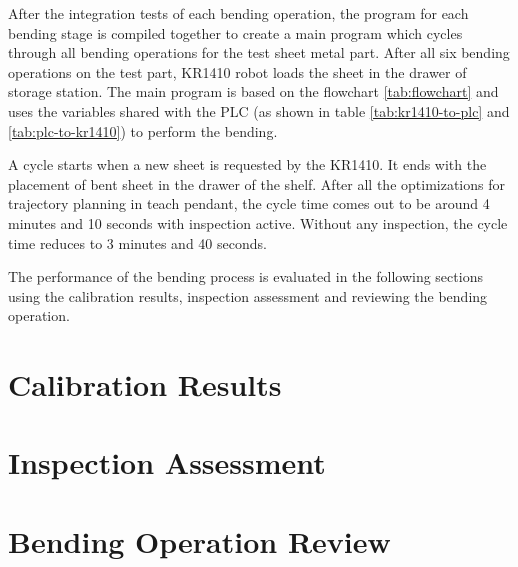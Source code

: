 After the integration tests of each bending operation, the program for each bending stage is compiled together to create a main program which cycles through all bending operations for the test sheet metal part. After all six bending operations on the test part, KR1410 robot loads the sheet in the drawer of storage station.
The main program is based on the flowchart \ref{tab:flowchart} and uses the variables shared with the PLC (as shown in table \ref{tab:kr1410-to-plc} and \ref{tab:plc-to-kr1410}) to perform the bending.

A cycle starts when a new sheet is requested by the KR1410. It ends with the placement of bent sheet in the drawer of the shelf. After all the optimizations for trajectory planning in teach pendant, the cycle time comes out to be around 4 minutes and 10 seconds with inspection active. Without any inspection, the cycle time reduces to 3 minutes and 40 seconds.

The performance of the bending process is evaluated in the following sections using the calibration results, inspection assessment and reviewing the bending operation.

\section{Calibration Results}
\label{sec:calibration-results}

\FloatBarrier  %

\section{Inspection Assessment}
\label{sec:inspection-assessment}

\FloatBarrier  %

\section{Bending Operation Review}
\label{sec:calibration-results}

\FloatBarrier  %


